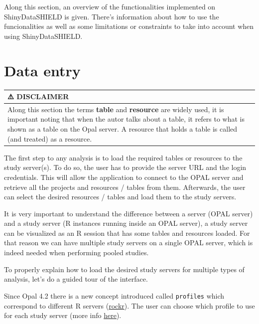 \documentclass[
]{book}
\begin{document}
Along this section, an overview of the functionalities implemented on ShinyDataSHIELD is given. There's information about how to use the funcionalities as well as some limitations or constraints to take into account when using ShinyDataSHIELD.

\hypertarget{data-entry}{%
\section{Data entry}\label{data-entry}}

\begin{longtable}[]{@{}
  >{\raggedright\arraybackslash}p{}@{}}
\toprule
⚠️ DISCLAIMER \\
\midrule
\endhead
Along this section the terms \textbf{table} and \textbf{resource} are widely used, it is important noting that when the autor talks about a table, it refers to what is shown as a table on the Opal server. A resource that holds a table is called (and treated) as a resource. \\
\bottomrule
\end{longtable}

The first step to any analysis is to load the required tables or resources to the study server(s). To do so, the user has to provide the server URL and the login credentials. This will allow the application to connect to the OPAL server and retrieve all the projects and resources / tables from them. Afterwards, the user can select the desired resources / tables and load them to the study servers.

It is very important to understand the difference between a server (OPAL server) and a study server (R instances running inside an OPAL server), a study server can be visualized as an R session that has some tables and resources loaded. For that reason we can have multiple study servers on a single OPAL server, which is indeed needed when performing pooled studies.

To properly explain how to load the desired study servers for multiple types of analysis, let's do a guided tour of the interface.

Since Opal 4.2 there is a new concept introduced called \texttt{profiles} which correspond to different R servers (\href{https://rockdoc.obiba.org/en/latest/}{rockr}). The user can choose which profile to use for each study server (more info \protect\hyperlink{profiles}{here}).
\end{document}
